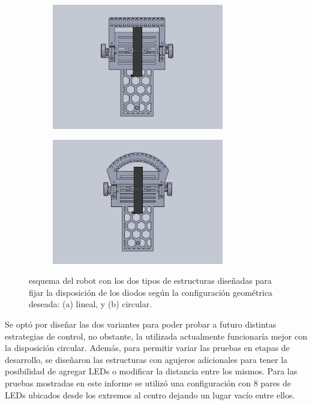 \documentclass[10pt,conference,a4paper,onecolumn]{article}%
\begin{document}
\begin{figure}[h!]%
    \centering
    \begin{subfigure}[h]{0.45\textwidth}
    	\centering
        \includegraphics[width=7.5cm]{./imagenes/conSensorLineal.png}
        \caption{}
    \end{subfigure}
    \quad
    \begin{subfigure}[h]{0.45\textwidth}
    	\centering
        \includegraphics[width=7.5cm]{./imagenes/conSensorCircular.png}
        \caption{}
    \end{subfigure}
    \caption{esquema del robot con los dos tipos de estructuras diseñadas para fijar la disposición de los diodos según la configuración geométrica deseada: (a) lineal, y (b) circular.}
	\label{fig:estructuraSensor}
\end{figure}

Se optó por diseñar las dos variantes para poder probar a futuro distintas estrategias de control, no obstante, la utilizada actualmente funcionaría mejor con la disposición circular. Además, para permitir variar las pruebas en etapas de desarrollo, se diseñaron las estructuras con agujeros adicionales para tener la posibilidad de agregar LEDs o modificar la distancia entre los mismos. Para las pruebas mostradas en este informe se utilizó una configuración con 8 pares de LEDs ubicados desde los extremos al centro dejando un lugar vacío entre ellos.
\end{document}
